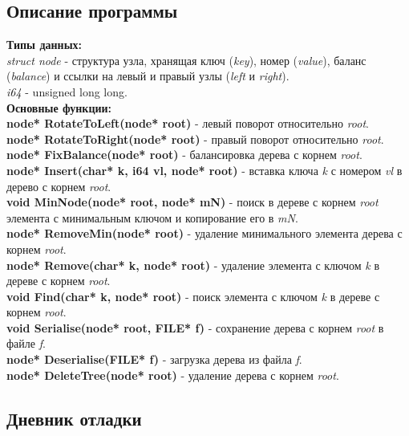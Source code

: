 \documentclass[12pt]{article}
\begin{document}
	\subsection*{Описание программы}
	
	\indent \textbf{Типы данных:}\\
	\indent\textit{struct node} - структура узла, хранящая ключ (\textit{key}), номер (\textit{value}), баланс (\textit{balance}) и ссылки на левый и правый узлы (\textit{left} и \textit{right}).\\
	\indent \textit{i64} - unsigned long long.\\
	
	\indent \textbf{Основные функции:}\\
	\textbf{node* RotateToLeft(node* root)} - левый поворот относительно \textit{root}.\\
	\textbf{node* RotateToRight(node* root)} - правый поворот относительно \textit{root}.\\
    \textbf{node* FixBalance(node* root)} - балансировка дерева с корнем \textit{root}.\\
    \textbf{node* Insert(char* k, i64 vl, node* root)} - вставка ключа \textit{k} с номером \textit{vl} в дерево с корнем \textit{root}.\\
    \textbf{void MinNode(node* root, node* mN)} - поиск в дереве с корнем \textit{root} элемента с минимальным ключом и копирование его в \textit{mN}.\\
    \textbf{node* RemoveMin(node* root)} - удаление минимального элемента дерева с корнем \textit{root}.\\
    \textbf{node* Remove(char* k, node* root)} - удаление элемента с ключом \textit{k} в дереве с корнем \textit{root}.\\
    \textbf{void Find(char* k, node* root)} - поиск элемента с ключом \textit{k} в дереве с корнем \textit{root}.\\
    \textbf{void Serialise(node* root, FILE* f)} - сохранение дерева с корнем \textit{root} в файле \textit{f}.\\
    \textbf{node* Deserialise(FILE* f)} - загрузка дерева из файла \textit{f}.\\
    \textbf{node* DeleteTree(node* root)} - удаление дерева с корнем \textit{root}.
    
	\subsection*{Дневник отладки}
	
\end{document}
